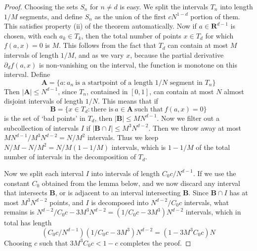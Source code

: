 \documentclass{report}
\theoremstyle{plain}
\theoremstyle{plain}
\begin{document}
\begin{proof}
    Choosing the sets $S_n$ for $n \neq d$ is easy. We split the intervals $T_n$ into length $1/M$ segments, and define $S_n$ as the union of the first $cN^{1-d}$ portion of them. This satisfies property (ii) of the theorem automatically. Now if $a \in \mathbf{R}^{d-1}$ is chosen, with each $a_k \in T_k$, then the total number of points $x \in T_d$ for which $f(a,x) = 0$ is $M$. This follows from the fact that $T_d$ can contain at most $M$ intervals of length $1/M$, and as we vary $x$, because the partial derivative $\partial_d f(a,x)$ is non-vanishing on the interval, the function is monotone on this interval. Define
    \[ \mathbf{A} = \{ a: a_n\ \text{is a startpoint of a length $1/N$ segment in $T_n$} \} \]
    Then $|\mathbf{A}| \leq N^{d-1}$, since $T_n$, contained in $[0,1]$, can contain at most $N$ almost disjoint intervals of length $1/N$. This means that if
    \[ \mathbf{B} = \{ x \in T_d: \text{there is}\ a \in \mathbf{A}\ \text{such that}\ f(a,x) = 0 \} \]
    is the set of `bad points' in $T_d$, then $|\mathbf{B}| \leq MN^{d-1}$. Now we filter out a subcollection of intervals $I$ if $|\mathbf{B} \cap I| \leq M^3N^{d-2}$. Then we throw away at most $MN^{d-1}/M^3N^{d-2} = N/M^2$ intervals. Thus we keep $N/M - N/M^2 = N/M(1 - 1/M)$ intervals, which is $1 - 1/M$ of the total number of intervals in the decomposition of $T_d$.

    Now we split each interval $I$ into intervals of length $C_0c / N^{d-1}$. If we use the constant $C_0$ obtained from the lemma below, and we now discard any interval that intersects $\mathbf{B}$, or is adjacent to an interval intersecting $\mathbf{B}$. Since $\mathbf{B} \cap I$ has at most $M^3N^{d-2}$ points, and $I$ is decomposed into $N^{d-2}/C_0c$ intervals, what remains is $N^{d-2}/C_0c - 3M^3N^{d-2} = (1/C_0c - 3M^3)N^{d-2}$ intervals, which in total has length
    \[ (C_0c/N^{d-1}) (1/C_0c - 3M^3)N^{d-2} = (1 - 3M^3 C_0c) N \]
    Choosing $c$ such that $3M^3C_0c < 1 - c$ completes the proof.
\end{proof}
\end{document}
